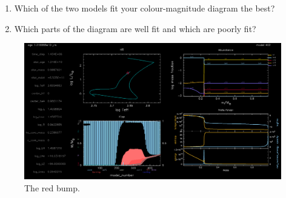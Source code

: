\documentclass{article}
\begin{document}
\begin{enumerate}
\begin{enumerate}
    \item \textbf{Red-Giant Branch:}
    Once the burning layer is a shell, the star continues to get redder, and it also gets brighter too, forming the ``red-giant branch.''
    \item \textbf{Red Bump:} The ``red bump'' is an excess of stars on the red-giant branch.  
    
    In the models, this is a loop up and down the giant branch, so the model line will look thicker here.  The burning region of stars in the red bump has just reached the bottom of the outer convective zone, bringing fresh fuel to the fusion region. This actually makes the stars fainter for a bit, but once the burning zone is connected convectively to the surface the stars get brighter quickly, so the observed colour-magnitude diagram thins out. (See Fig.~\ref{fig:bump})
    
    \item \textbf{Red Clump}: Not all clusters have a ``red clump'' which is the region just redward of the giant branch.  Some have a large horizontal group of stars reaching blueward called ``the horizonal branch.''  Stars in the red clump or the horizontal branch are fusing helium in their cores.  What does your cluster have?  The bump of your cluster might be brighter or fainter than the red clump.  Is yours brighter or fainter?  
    
    In the models this part of the evolution looks like a bunch of loops.
\end{enumerate}
    \item Which of the two models fit your colour-magnitude diagram the best?  
    \item Which parts of the diagram are well fit and which are poorly fit?
\end{enumerate}
\begin{figure}[h]
\centering
\includegraphics[width=\textwidth]{latex/grid1000462.png}
\caption{The red bump.}
\label{fig:bump}
\end{figure}
\end{document}
